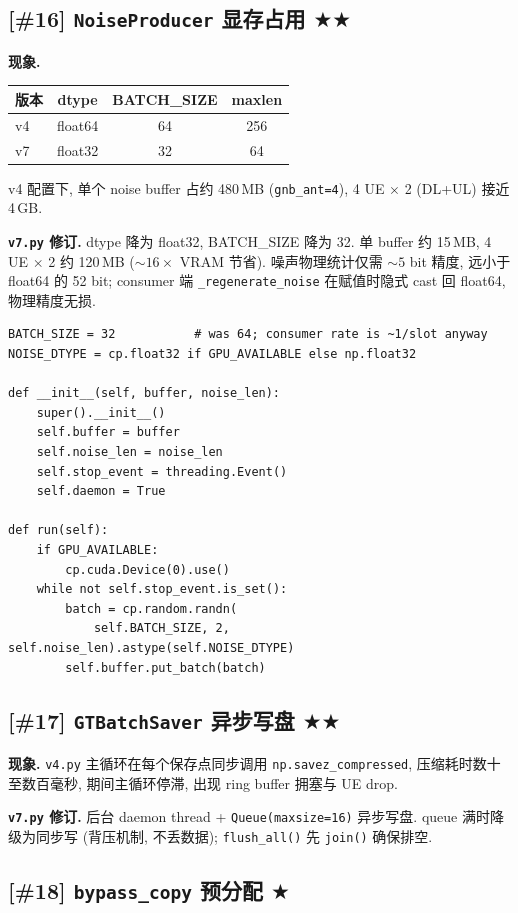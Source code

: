\documentclass[11pt,a4paper,UTF8,fontset=fandol]{ctexart}
\newcommand{\sone}{\textcolor{starcolor}{$\bigstar$}}
\newcommand{\stwo}{\textcolor{starcolor}{$\bigstar\bigstar$}}
\newcommand{\vfour}{\texttt{v4.py}}
\newcommand{\vseven}{\texttt{v7.py}}
\newcommand{\bugitem}[3]{%
  \subsection{[\##1] #2 \hfill #3}%
  \vspace{-0.5em}%
}
\begin{document}
\bugitem{16}{\texttt{NoiseProducer} 显存占用}{\stwo}

\textbf{现象.}
\begin{center}
\begin{tabular}{l c c c}
\toprule
版本 & dtype & BATCH\_SIZE & maxlen \\
\midrule
v4 & float64 & 64 & 256 \\
v7 & float32 & 32 & 64 \\
\bottomrule
\end{tabular}
\end{center}
v4 配置下, 单个 noise buffer 占约 480\,MB (\texttt{gnb\_ant=4}),
4 UE $\times$ 2 (DL+UL) 接近 4\,GB.

\textbf{\vseven{} 修订.} dtype 降为 float32, BATCH\_SIZE 降为 32.
单 buffer 约 15\,MB, 4 UE $\times$ 2 约 120\,MB ($\sim 16\times$ VRAM 节省).
噪声物理统计仅需 $\sim 5$ bit 精度, 远小于 float64 的 52 bit; consumer 端
\texttt{\_regenerate\_noise} 在赋值时隐式 cast 回 float64, 物理精度无损.

\begin{lstlisting}[caption={v7.py: lines 2184--2200}]
BATCH_SIZE = 32           # was 64; consumer rate is ~1/slot anyway
NOISE_DTYPE = cp.float32 if GPU_AVAILABLE else np.float32

def __init__(self, buffer, noise_len):
    super().__init__()
    self.buffer = buffer
    self.noise_len = noise_len
    self.stop_event = threading.Event()
    self.daemon = True

def run(self):
    if GPU_AVAILABLE:
        cp.cuda.Device(0).use()
    while not self.stop_event.is_set():
        batch = cp.random.randn(
            self.BATCH_SIZE, 2, self.noise_len).astype(self.NOISE_DTYPE)
        self.buffer.put_batch(batch)
\end{lstlisting}

\bugitem{17}{\texttt{GTBatchSaver} 异步写盘}{\stwo}

\textbf{现象.} \vfour{} 主循环在每个保存点同步调用 \texttt{np.savez\_compressed},
压缩耗时数十至数百毫秒, 期间主循环停滞, 出现 ring buffer 拥塞与 UE drop.

\textbf{\vseven{} 修订.} 后台 daemon thread + \texttt{Queue(maxsize=16)}
异步写盘. queue 满时降级为同步写 (背压机制, 不丢数据);
\texttt{flush\_all()} 先 \texttt{join()} 确保排空.

\bugitem{18}{\texttt{bypass\_copy} 预分配}{\sone}
\end{document}
